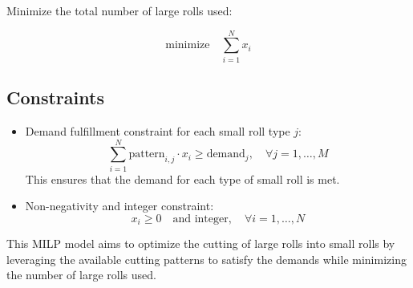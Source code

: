 \documentclass{article}
\begin{document}
Minimize the total number of large rolls used:

\[
\text{minimize} \quad \sum_{i=1}^{N} x_i
\]

\subsection*{Constraints}

\begin{itemize}
    \item Demand fulfillment constraint for each small roll type \( j \):
    \[
    \sum_{i=1}^{N} \text{pattern}_{i,j} \cdot x_i \geq \text{demand}_j, \quad \forall j = 1, \ldots, M
    \]
    This ensures that the demand for each type of small roll is met.

    \item Non-negativity and integer constraint:
    \[
    x_i \geq 0 \quad \text{and integer}, \quad \forall i = 1, \ldots, N
    \]
\end{itemize}

This MILP model aims to optimize the cutting of large rolls into small rolls by leveraging the available cutting patterns to satisfy the demands while minimizing the number of large rolls used.
\end{document}
